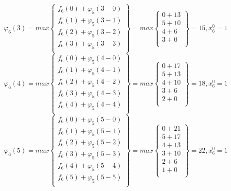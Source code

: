 $\varphi_6(3) = max \begin{Bmatrix}
    f_6(0) + \varphi_5(3 - 0) \\
    f_6(1) + \varphi_5(3 - 1) \\
    f_6(2) + \varphi_5(3 - 2) \\
    f_6(3) + \varphi_5(3 - 3) \\
\end{Bmatrix} = max \begin{Bmatrix}
    0 + 13 \\
    5 + 10 \\
    4 + 6 \\
    3 + 0 \\
\end{Bmatrix} = 15, x_6^0 = 1$\\

$\varphi_6(4) = max \begin{Bmatrix}
    f_6(0) + \varphi_5(4 - 0) \\
    f_6(1) + \varphi_5(4 - 1) \\
    f_6(2) + \varphi_5(4 - 2) \\
    f_6(3) + \varphi_5(4 - 3) \\
    f_6(4) + \varphi_5(4 - 4) \\
\end{Bmatrix} = max \begin{Bmatrix}
    0 + 17 \\
    5 + 13 \\
    4 + 10 \\
    3 + 6 \\
    2 + 0 \\
\end{Bmatrix} = 18, x_6^0 = 1$\\

$\varphi_6(5) = max \begin{Bmatrix}
    f_6(0) + \varphi_5(5 - 0) \\
    f_6(1) + \varphi_5(5 - 1) \\
    f_6(2) + \varphi_5(5 - 2) \\
    f_6(3) + \varphi_5(5 - 3) \\
    f_6(4) + \varphi_5(5 - 4) \\
    f_6(5) + \varphi_5(5 - 5) \\
\end{Bmatrix} = max \begin{Bmatrix}
    0 + 21 \\
    5 + 17 \\
    4 + 13 \\
    3 + 10 \\
    2 + 6 \\
    1 + 0 \\
\end{Bmatrix} = 22, x_6^0 = 1$\\

